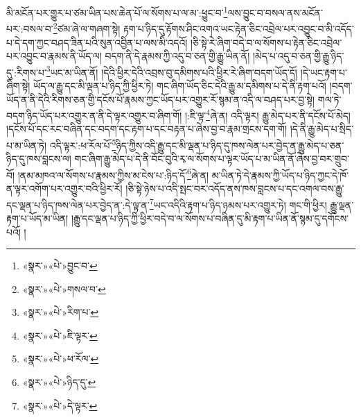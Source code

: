 མི་མངོན་པར་གྱུར་པ་ཙམ་ཡིན་པས་ཆེན་པོ་ལ་སོགས་པ་ལ་མ་:ཕྱུང་བ་\footnote{«སྣར་»«པེ་»བྱུང་བ་}ལས་བྱུང་བ་བསལ་ནས་མངོན་པར་:བསལ་བ་\footnote{«སྣར་»«པེ་»གསལ་བ་}ཙམ་ཞེ་ལ་གཞག་སྟེ། རྟག་པ་ཉིད་དུ་རྟོགས་ཤིང་འགའ་ཡང་རྟེན་ཅིང་འབྲེལ་པར་འབྱུང་བ་མི་འདོད་པ་དེ་དག་ཀྱང་བཤད་ཟིན་པའི་སུན་འབྱིན་པ་ལས་མི་འདའོ། །ཅི་སྟེ་རེ་ཞིག་བདེ་བ་ལ་སོགས་པ་རྟེན་ཅིང་འབྲེལ་པར་འབྱུང་བ་རྣམས་ནི་ཡོད་ལ། བདག་ནི་དེ་རྣམས་ཀྱི་འདུ་བ་ཅན་གྱི་རྒྱུ་ཡིན་ནོ། །མེད་པ་འདུ་བ་ཅན་གྱི་རྒྱུ་ཉིད་དུ་:རིགས་པ་\footnote{«སྣར་»«པེ་»རིག་པ་}ཡང་མ་ཡིན་ནོ། །དེའི་ཕྱིར་དེའི་འབྲས་བུ་དམིགས་པའི་ཕྱིར་རེ་ཞིག་བདག་ཡོད་དོ། །དེ་ཡང་རྟག་པ་ཞིག་སྟེ། ཡོད་ལ་རྒྱུ་དང་མི་ལྡན་པ་ཉིད་ཀྱི་ཕྱིར་ཏེ། གང་ཞིག་ཡོད་ཅིང་དེའི་རྒྱུ་མ་དམིགས་པ་དེ་ནི་རྟག་པའོ། །བདག་ཡོད་ན་ནི་དེའི་རིགས་ཅན་གྱི་དངོས་པོ་རྣམས་ཀྱང་ཡོད་པར་འགྱུར་རོ་སྙམ་ན་འདི་ལ་བཤད་པར་བྱ་སྟེ། གལ་ཏེ་བདག་ཉིད་ཡོད་པར་འགྱུར་ན་ནི་དེ་ལྟར་འགྱུར་བ་ཞིག་གོ། །:ཇི་ལྟ་\footnote{«སྣར་»«པེ་»ཇི་ལྟར་}ཞེ་ན། འདི་ལྟར། རྒྱུ་མེད་པར་ནི་དངོས་པོ་མེད། །དངོས་པོ་དང་རང་བཞིན་དང་བདག་དང་རྟག་པ་དང་བརྟན་པ་ཞེས་བྱ་བ་རྣམ་གྲངས་དག་གོ། །དེ་ནི་རྒྱུ་མེད་པ་སྲིད་པ་མ་ཡིན་ཏེ། འདི་ལྟར་:ཕ་རོལ་པོ་\footnote{«སྣར་»«པེ་»ཕ་རོལ་}ཉིད་ཀྱིས་འདི་རྒྱུ་དང་མི་ལྡན་པ་ཉིད་དུ་ཁས་ལེན་པར་བྱེད་ན་རྒྱུ་མེད་པ་ཅན་ཉིད་དུ་ཁས་བླངས་ལ། གང་ཞིག་རྒྱུ་མེད་པ་དེ་ནི་བོང་བུའི་རྭ་ལ་སོགས་པ་ལྟར་ཡོད་པ་མ་ཡིན་ནོ་ཞེས་བྱ་བར་གྲུབ་བོ། །ནམ་མཁའ་ལ་སོགས་པ་རྣམས་ཀྱིས་མ་ངེས་པ་:ཉིད་དོ་\footnote{«སྣར་»«པེ་»ཉིད་དུ་}ཞེ་ན། མ་ཡིན་ཏེ་དེ་རྣམས་ཀྱི་ཡོད་པ་ཉིད་ཀྱང་དེ་ཁོ་ན་ལྟར་འགོག་པར་འགྱུར་བའི་ཕྱིར་རོ། །ཅི་སྟེ་ཉེས་པ་འདི་སྤང་བར་འདོད་ནས་ཁས་བླངས་པ་དང་འགལ་བས་རྒྱུ་དང་ལྡན་པ་ཉིད་ཁས་ལེན་པར་བྱེད་ན་:དེ་ལྟ་ན་\footnote{«སྣར་»«པེ་»དེ་ལྟར་}ཡང་འདིའི་རྟག་པ་ཉིད་ཉམས་པར་འགྱུར་ཏེ། གང་གི་ཕྱིར། རྒྱུ་ལྡན་རྟག་པ་ཡོད་མ་ཡིན། །རྒྱུ་དང་ལྡན་པ་ཉིད་ཀྱི་ཕྱིར་བདེ་བ་ལ་སོགས་པ་བཞིན་དུ་མི་རྟག་པ་ཡིན་ནོ་སྙམ་དུ་དགོངས་པའོ། །
